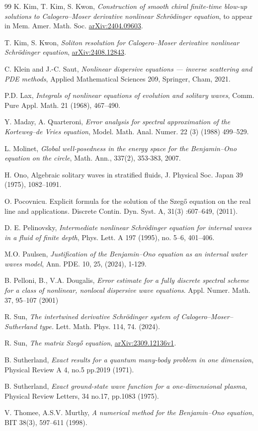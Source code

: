 \documentclass [11pt] {article}
\begin{document}
\begin{thebibliography}{99}
 K. Kim, T. Kim, S. Kwon, {\it Construction of smooth chiral finite-time blow-up solutions to Calogero--Moser derivative nonlinear Schrödinger equation},  to appear in Mem. Amer. Math. Soc. \href{https://arxiv.org/abs/2404.09603}{arXiv:2404.09603}.

 T. Kim, S. Kwon, {\it Soliton resolution for Calogero--Moser derivative nonlinear Schrödinger equation}, \href{https://arxiv.org/abs/2408.12843}{arXiv:2408.12843}.

 C. Klein and J.-C. Saut, {\it Nonlinear dispersive equations --- inverse scattering and PDE methods}, Applied Mathematical Sciences 209, Springer, Cham, 2021.

 P.D. Lax, {\it Integrals of nonlinear equations of evolution and solitary waves}, Comm. Pure Appl. Math. 21 (1968), 467--490.

 Y. Maday, A. Quarteroni, {\it Error analysis for spectral approximation of the Korteweg--de Vries equation}, Model. Math. Anal. Numer. 22 (3) (1988) 499--529.

 L. Molinet, {\it Global well-posedness in the energy space for the Benjamin–Ono equation on the circle}, Math. Ann., 337(2), 353-383, 2007.

 H. Ono, Algebraic solitary waves in stratified fluids, J. Physical Soc. Japan 39 (1975), 1082--1091.

 O. Pocovnicu. Explicit formula for the solution of the Szeg\H o equation on the real line and applications. Discrete Contin. Dyn. Syst. A, 31(3) :607--649, (2011).

 D. E. Pelinovsky, {\it Intermediate nonlinear Schr\"odinger equation for internal waves in a fluid of finite depth}, Phys. Lett. A 197 (1995), no. 5--6, 401--406.

 M.O. Paulsen, {\it Justification of the Benjamin–Ono equation as an internal water waves model}, Ann. PDE. 10, 25, (2024), 1-129.

 B. Pelloni, B., V.A. Dougalis, {\it Error estimate for a fully discrete spectral scheme for a class of nonlinear, nonlocal dispersive wave equations}. Appl. Numer. Math. 37, 95--107 (2001)

 R. Sun, {\it The intertwined derivative Schr\"odinger system of Calogero--Moser--Sutherland type.} Lett. Math. Phys. 114, 74. (2024). 

 R. Sun, {\it The matrix Szeg\H o equation}, \href{https://arxiv.org/abs/2309.12136v1}{arXiv:2309.12136v1}.

 B. Sutherland, {\it Exact results for a quantum many-body problem in one dimension}, Physical Review A 4, no.5 pp.2019 (1971).

 B. Sutherland, {\it Exact ground-state wave function for a one-dimensional plasma}, Physical Review Letters, 34 no.17, pp.1083 (1975).

 V. Thomee, A.S.V. Murthy, {\it A numerical method for the Benjamin--Ono equation}, BIT 38(3), 597--611 (1998).

\end{thebibliography}
\end{document}
